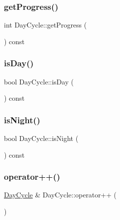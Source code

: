 \mbox{\label{classDayCycle_aab4c411cdcb1b80daa5219a6aa339ebe_aab4c411cdcb1b80daa5219a6aa339ebe}} 
\subsubsection{\texorpdfstring{get\+Progress()}{getProgress()}}
{\footnotesize\ttfamily int Day\+Cycle\+::get\+Progress (\begin{DoxyParamCaption}{ }\end{DoxyParamCaption}) const}

\mbox{\label{classDayCycle_a143c56cd6f6bd7ff5a3b73e385ec771e_a143c56cd6f6bd7ff5a3b73e385ec771e}} 
\subsubsection{\texorpdfstring{is\+Day()}{isDay()}}
{\footnotesize\ttfamily bool Day\+Cycle\+::is\+Day (\begin{DoxyParamCaption}{ }\end{DoxyParamCaption}) const}

\mbox{\label{classDayCycle_aac8bd32b0e81f5b30d2853abb5925d3e_aac8bd32b0e81f5b30d2853abb5925d3e}} 
\subsubsection{\texorpdfstring{is\+Night()}{isNight()}}
{\footnotesize\ttfamily bool Day\+Cycle\+::is\+Night (\begin{DoxyParamCaption}{ }\end{DoxyParamCaption}) const}

\mbox{\label{classDayCycle_a44a7b511e82ac36f4937867a6ff0de99_a44a7b511e82ac36f4937867a6ff0de99}} 
\subsubsection{\texorpdfstring{operator++()}{operator++()}\hspace{0.1cm}{\footnotesize\ttfamily [1/2]}}
{\footnotesize\ttfamily \hyperlink{classDayCycle}{Day\+Cycle} \& Day\+Cycle\+::operator++ (\begin{DoxyParamCaption}{ }\end{DoxyParamCaption})}

